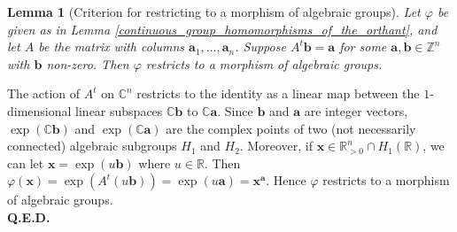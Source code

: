 \documentclass[9pt]{amsart}
\theoremstyle{my_theorem_style}
\numberwithin{definition}{section}
\newtheorem{lemma}[definition]{Lemma}
\renewenvironment{proof}{\noindent {\textbf{Proof.}}}{\\\textbf{Q.E.D.}}
\newcommand{\C}{\mathbb{C}}
\newcommand{\G}{\mathbb{G}}
\renewcommand{\phi}{\varphi}
\newcommand{\R}{\mathbb{R}}
\renewcommand{\vec}[1]{\bm{#1}}
\newcommand{\Z}{\mathbb{Z}}
\begin{document}
\begin{lemma}
[Criterion for restricting to a morphism of algebraic groups]
\label{restricting_to_a_morphism_of_algebraic_groups_criterion}
    Let $\phi$ be given as in Lemma \ref{continuous_group_homomorphisms_of_the_orthant}, and let $A$ be the matrix with columns $\vec{a}_1, \dots, \vec{a}_n$. Suppose $A^t \vec{b} = \vec{a}$ for some $\vec{a}, \vec{b} \in \Z^n$ with $\vec{b}$ non-zero. Then $\phi$ restricts to a morphism of algebraic groups.
\end{lemma}
\begin{proof}
    The action of $A^t$ on $\C^n$ restricts to the identity as a linear map between the $1$-dimensional linear subspaces $\C \vec{b}$ to $\C \vec{a}$. Since $\vec{b}$ and $\vec{a}$ are integer vectors, $\exp(\C \vec{b})$ and $\exp(\C \vec{a})$ are the complex points of two (not necessarily connected) algebraic subgroups $H_1$ and $H_2$. Moreover, if $\vec{x} \in \R_{>0}^n \cap H_1(\R)$, we can let $\vec{x} = \exp(u \vec{b})$ where $u \in \R$. Then $\phi(\vec{x}) = \exp(A^t(u\vec{b})) = \exp(u\vec{a}) = \vec{x}^{\vec{a}}$. Hence $\phi$ restricts to a morphism of algebraic groups. 
\end{proof}
\end{document}
